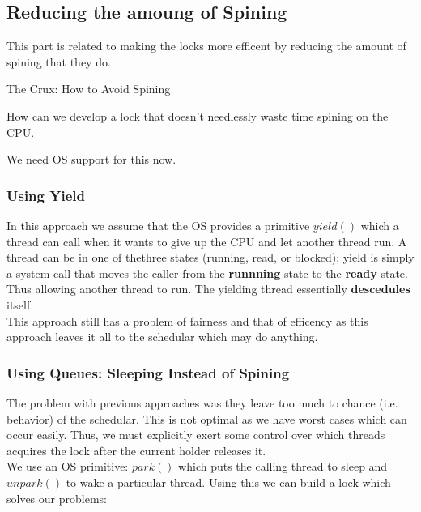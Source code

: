\subsection{Reducing the amoung of Spining}

This part is related to making the locks more efficent by reducing the amount of
spining that they do.

\begin{tcolorbox}
    \begin{center}
        The Crux: How to Avoid Spining
    \end{center}

    How can we develop a lock that doesn't needlessly waste time spining on the
    CPU.
\end{tcolorbox}

We need OS support for this now.

\subsubsection{Using Yield}

In this approach we assume that the OS provides a primitive $yield()$ which a
thread can call when it wants to give up the CPU and let another thread run.
A thread can be in one of thethree states (running, read, or blocked); yield
is simply a system call that moves the caller from the \textbf{runnning} state
to the \textbf{ready} state. Thus allowing another thread to run. The yielding
thread essentially \textbf{descedules} itself.\\

This approach still has a problem of fairness and that of efficency as this 
approach leaves it all to the schedular which may do anything.

\subsubsection{Using Queues: Sleeping Instead of Spining}

The problem with previous approaches was they leave too much to chance (i.e.
behavior) of the schedular. This is not optimal as we have worst cases which
can occur easily. Thus, we must explicitly exert some control over which
threads acquires the lock after the current holder releases it.\\

We use an OS primitive: $park()$ which puts the calling thread to sleep and
$unpark()$ to wake a particular thread. Using this we can build a lock which
solves our problems:

